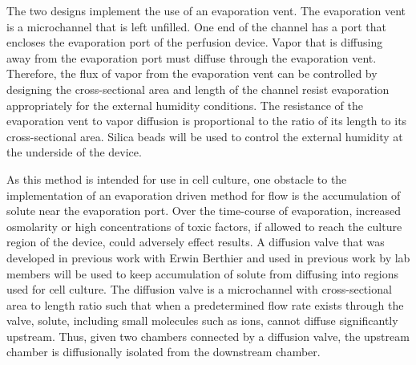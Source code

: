 The two designs implement the use of an evaporation vent. The evaporation vent is a microchannel that is left unfilled. One end of the channel has a port that encloses the evaporation port of the perfusion device. Vapor that is diffusing away from the evaporation port must diffuse through the evaporation vent. Therefore, the flux of vapor from the evaporation vent can be controlled by designing the cross-sectional area and length of the channel resist evaporation appropriately for the external humidity conditions. The resistance of the evaporation vent to vapor diffusion is proportional to the ratio of its length to its cross-sectional area. Silica beads will be used to control the external humidity at the underside of the device. 


As this method is intended for use in cell culture, one obstacle to the implementation of an evaporation driven method for flow is the accumulation of solute near the evaporation port. Over the time-course of evaporation, increased osmolarity or high concentrations of toxic factors, if allowed to reach the culture region of the device, could adversely effect results. A diffusion valve that was developed in previous work with Erwin Berthier and used in previous work by lab members \cite{Frisk:2008pi} will be used to keep accumulation of solute from diffusing into regions used for cell culture. The diffusion valve is a microchannel with cross-sectional area to length ratio such that when a predetermined flow rate exists through the valve, solute, including small molecules such as ions, cannot diffuse significantly upstream. Thus, given two chambers connected by a diffusion valve, the upstream chamber is diffusionally isolated from the downstream chamber. 


